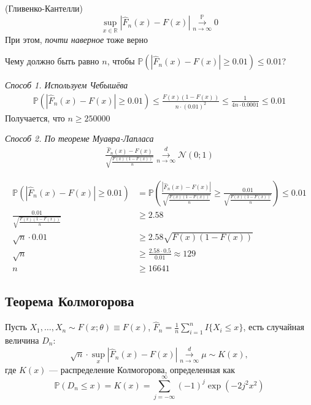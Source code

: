\documentclass[a4paper, 10pt]{article}
\begin{document}
\theorem (Гливенко-Кантелли) 
\begin{equation*}
    \sup\limits_{x\in\mathbb{R}}\left|\widehat{F}_n(x)-F(x)\right|\overset{\mathbb{P}}{\underset{n\to\infty}{\longrightarrow}}0
\end{equation*}
При этом, \textit{почти наверное} тоже верно

\ex Чему должно быть равно $n$, чтобы $\mathbb{P}\left(\left|\widehat{F}_n(x)-F(x)\right|\geqslant0.01\right)\leqslant0.01$?

\textit{Способ 1. Используем Чебышёва}
\begin{equation*}
    \begin{aligned}
        \mathbb{P}(|\widehat{F}_n(x)-F(x)|\geqslant0.01)\leqslant\frac{F(x)(1-F(x))}{n\cdot(0.01)^2}\leqslant\frac{1}{4n\cdot0.0001}\leqslant0.01
    \end{aligned}
\end{equation*}
Получается, что $n\geqslant250000$

\textit{Способ 2. По теореме Муавра-Лапласа}
\begin{equation*}
    \begin{aligned}
        \frac{\widehat{F}_n(x)-F(x)}{\sqrt{\frac{F(x)(1-F(x))}{n}}}\overset{d}{\underset{n\to\infty}{\longrightarrow}}\mathcal{N}(0;1)
    \end{aligned}
\end{equation*}

\begin{equation*}
    \begin{aligned}
        \mathbb{P}(|\widehat{F}_n(x)-F(x)|\geqslant0.01)&=\mathbb{P}\left(\frac{|\widehat{F}_n(x)-F(x)|}{\sqrt{\frac{F(x)(1-F(x))}{n}}}\geqslant\frac{0.01}{\sqrt{\frac{F(x)(1-F(x))}{n}}}\right)\leqslant0.01\\
        \frac{0.01}{\sqrt{\frac{F(x)(1-F(x))}{n}}}&\geqslant2.58\\
        \sqrt{n}\cdot0.01&\geqslant2.58\sqrt{F(x)(1-F(x))}\\
        \sqrt{n}&\geqslant\frac{2.58\cdot0.5}{0.01}\approx129\\
        n&\geqslant16641
    \end{aligned}
\end{equation*}

\subsection{Теорема Колмогорова}
\theorem Пусть $X_1,\ldots,X_n\sim F(x;\theta)\equiv F(x)$, $\widehat{F}_n=\displaystyle\frac{1}{n}\sum_{i=1}^n I\{X_i\leqslant x\}$, есть случайная величина $D_n$:
\begin{equation*}
    \sqrt{n}\cdot\sup\limits_{x}|\widehat{F}_n(x)-F(x)|\overset{d}{\underset{n\to\infty}{\longrightarrow}}\mu\sim K(x),
\end{equation*}
где $K(x)$ — распределение Колмогорова, определенная как
\begin{equation*}
    \mathbb{P}(D_n\leqslant x)=K(x)=\sum_{j=-\infty}^{\infty}(-1)^j\exp\left(-2j^2x^2\right)
\end{equation*}
\end{document}
